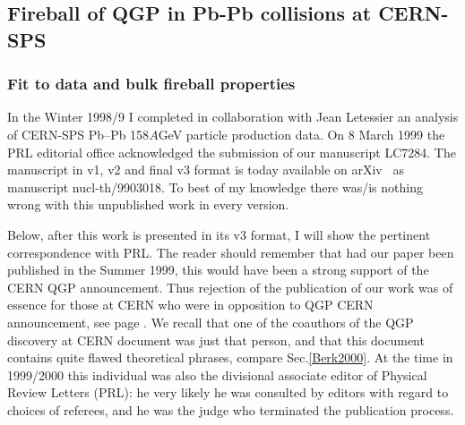 \subsection{Fireball of QGP in Pb-Pb collisions at CERN-SPS}\label{PRL2000}

\subsubsection{Fit to data and bulk fireball properties}

In the Winter 1998/9 I completed in collaboration with Jean Letessier an analysis of CERN-SPS Pb--Pb 158$A$\;GeV particle production data. On 8 March 1999 the PRL editorial office acknowledged the submission of our manuscript LC7284. The manuscript in v1, v2 and final v3 format is today available on arXiv~\cite{Rafelski:1999xv} as manuscript nucl-th/9903018. To best of my knowledge there was/is nothing wrong with this unpublished work in every version. 

Below, after this work is presented in its v3 format, I will show the pertinent correspondence with PRL. The reader should remember that had our paper been published  in the Summer 1999, this would have been a strong support of the CERN QGP announcement. Thus rejection of the publication of our work was of essence for those at CERN who were in opposition to QGP CERN announcement, see page \pageref{Heinz2000}. We recall that one of the coauthors of the  QGP discovery at CERN document was just that person, and that this document contains quite flawed theoretical phrases, compare Sec.\ref{Berk2000}. At the time in 1999/2000 this individual was also the divisional associate editor of Physical Review Letters (PRL): he very likely he was consulted by editors with regard to choices of referees, and he was the judge who terminated the publication process.\\
 
